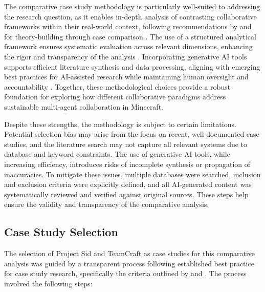 \documentclass[a4paper, 12pt]{article}
\begin{document}
The comparative case study methodology is particularly well-suited to addressing the research question, as it enables in-depth analysis of contrasting collaborative frameworks within their real-world context, following recommendations by \textcite{Yin2018CaseStudyResearchDesignMethods} and \textcite{Eisenhardt1989BuildingTheoriesFromCaseStudyResearch} for theory-building through case comparison \autocite{Yin2018CaseStudyResearchDesignMethods,Eisenhardt1989BuildingTheoriesFromCaseStudyResearch}. The use of a structured analytical framework ensures systematic evaluation across relevant dimensions, enhancing the rigor and transparency of the analysis \autocite{Miles1994QualitativeDataAnalysis}. Incorporating generative AI tools supports efficient literature synthesis and data processing, aligning with emerging best practices for AI-assisted research while maintaining human oversight and accountability \autocite{lund2023chatgpt}. Together, these methodological choices provide a robust foundation for exploring how different collaborative paradigms address sustainable multi-agent collaboration in Minecraft.

Despite these strengths, the methodology is subject to certain limitations. Potential selection bias may arise from the focus on recent, well-documented case studies, and the literature search may not capture all relevant systems due to database and keyword constraints. The use of generative AI tools, while increasing efficiency, introduces risks of incomplete synthesis or propagation of inaccuracies. To mitigate these issues, multiple databases were searched, inclusion and exclusion criteria were explicitly defined, and all AI-generated content was systematically reviewed and verified against original sources. These steps help ensure the validity and transparency of the comparative analysis.

\subsection{Case Study Selection}

The selection of Project Sid and TeamCraft as case studies for this comparative analysis was guided by a transparent process following established best practice for case study research, specifically the criteria outlined by \textcite{Yin2018CaseStudyResearchDesignMethods} and \textcite{Eisenhardt1989BuildingTheoriesFromCaseStudyResearch}. The process involved the following steps:
\end{document}
